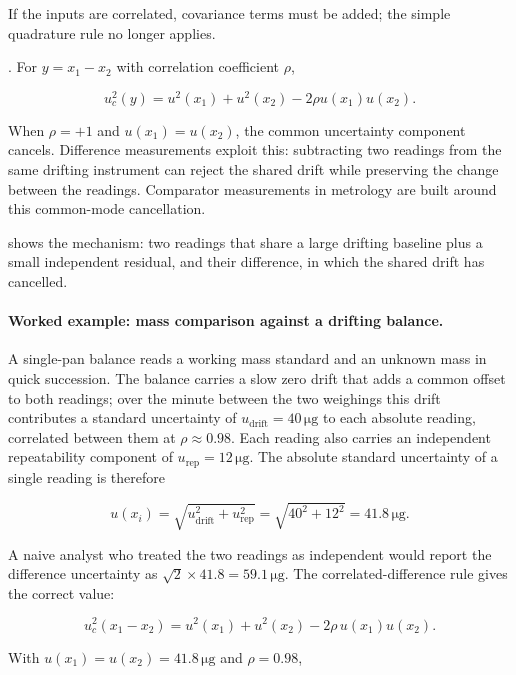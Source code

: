 If the inputs are correlated, covariance terms must be added; the
simple quadrature rule no longer applies.

. For
$y = x_{1} - x_{2}$ with correlation coefficient $\rho$,

\[
u_{c}^{2}(y) = u^{2}(x_{1}) + u^{2}(x_{2}) - 2\rho u(x_{1}) u(x_{2}).
\]

When $\rho = +1$ and $u(x_{1}) = u(x_{2})$, the common uncertainty
component cancels. Difference measurements exploit this: subtracting
two readings from the same drifting instrument can reject the shared
drift while preserving the change between the readings. Comparator
measurements in metrology are built around this common-mode
cancellation.



 shows the mechanism: two readings
that share a large drifting baseline plus a small independent
residual, and their difference, in which the shared drift has
cancelled.

\paragraph{Worked example: mass comparison against a drifting
balance.} A single-pan balance reads a working mass standard and an
unknown mass in quick succession. The balance carries a slow zero
drift that adds a common offset to both readings; over the minute
between the two weighings this drift contributes a standard
uncertainty of $u_{\text{drift}} = 40\,\si{\micro\gram}$ to each
absolute reading, correlated between them at $\rho \approx 0.98$.
Each reading also carries an independent repeatability component of
$u_{\text{rep}} = 12\,\si{\micro\gram}$. The absolute standard
uncertainty of a single reading is therefore

\[
u(x_{i}) = \sqrt{u_{\text{drift}}^{2} + u_{\text{rep}}^{2}}
= \sqrt{40^{2} + 12^{2}} = 41.8\,\si{\micro\gram}.
\]

A naive analyst who treated the two readings as independent would
report the difference uncertainty as $\sqrt{2} \times 41.8 =
59.1\,\si{\micro\gram}$. The correlated-difference rule gives the
correct value:

\[
u_{c}^{2}(x_{1} - x_{2}) = u^{2}(x_{1}) + u^{2}(x_{2})
- 2\rho\, u(x_{1}) u(x_{2}).
\]

With $u(x_{1}) = u(x_{2}) = 41.8\,\si{\micro\gram}$ and
$\rho = 0.98$,

